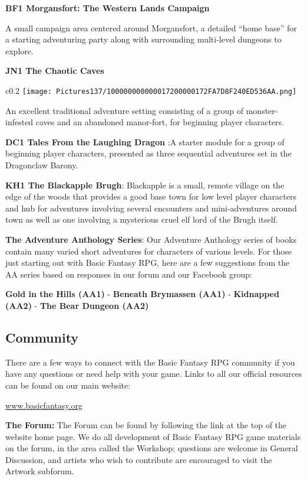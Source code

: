 \documentclass[a4paper,twoside,openany,10pt]{book}
\begin{document}
\textbf{BF1 Morgansfort: The Western Lands Campaign}

A small campaign area centered around Morgansfort, a detailed ``home base'' for a starting adventuring party along with surrounding multi-level dungeons to explore.

\textbf{JN1 The Chaotic Caves}

\begin{wrapfigure}{c}{0.2\textwidth}
	 \texttt{[image: Pictures137/100000000000017200000172FA7D8F240ED536AA.png]}  
\end{wrapfigure}


An excellent traditional adventure setting consisting of a group of monster-infested caves and an abandoned manor-fort, for beginning player characters.

\textbf{DC1 Tales From the Laughing Dragon} :A starter module for a group of beginning player characters, presented as three sequential adventures set in the Dragonclaw Barony.

\textbf{KH1 The Blackapple Brugh}: Blackapple is a small, remote village on the edge of the woods that provides a good base town for low level player characters and hub for adventures involving several encounters and mini-adventures around town as well as one involving a mysterious cruel elf lord of the Brugh itself.

\textbf{The Adventure Anthology Series}: Our Adventure Anthology series of books contain many varied short adventures for characters of various levels. For those just starting out with Basic Fantasy RPG, here are a few suggestions from the AA series based on responses in our forum and our Facebook group:

\textbf{Gold in the Hills (AA1)} - \textbf{Beneath Brymassen (AA1)} -  \textbf{Kidnapped (AA2)} - \textbf{The Bear Dungeon (AA2)}


\subsection{Community}\label{community}

There are a few ways to connect with the Basic Fantasy RPG community if you have any questions or need help with your game. Links to all our official resources can be found on our main website:

\href{www.basicfantasy.org}{www.basicfantasy.org}

\textbf{The Forum:} The Forum can be found by following the link at the top of the website home page. We do all development of Basic Fantasy RPG game materials on the forum, in the area called the Workshop; questions are welcome in General Discussion, and artists who wish to contribute are encouraged to visit the Artwork subforum.
\end{document}
